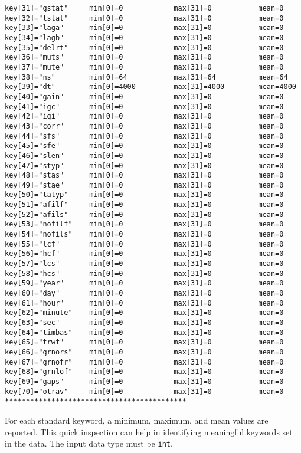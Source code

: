 \begin{verbatim}
key[31]="gstat"     min[0]=0            max[31]=0           mean=0
key[32]="tstat"     min[0]=0            max[31]=0           mean=0
key[33]="laga"      min[0]=0            max[31]=0           mean=0
key[34]="lagb"      min[0]=0            max[31]=0           mean=0
key[35]="delrt"     min[0]=0            max[31]=0           mean=0
key[36]="muts"      min[0]=0            max[31]=0           mean=0
key[37]="mute"      min[0]=0            max[31]=0           mean=0
key[38]="ns"        min[0]=64           max[31]=64          mean=64
key[39]="dt"        min[0]=4000         max[31]=4000        mean=4000
key[40]="gain"      min[0]=0            max[31]=0           mean=0
key[41]="igc"       min[0]=0            max[31]=0           mean=0
key[42]="igi"       min[0]=0            max[31]=0           mean=0
key[43]="corr"      min[0]=0            max[31]=0           mean=0
key[44]="sfs"       min[0]=0            max[31]=0           mean=0
key[45]="sfe"       min[0]=0            max[31]=0           mean=0
key[46]="slen"      min[0]=0            max[31]=0           mean=0
key[47]="styp"      min[0]=0            max[31]=0           mean=0
key[48]="stas"      min[0]=0            max[31]=0           mean=0
key[49]="stae"      min[0]=0            max[31]=0           mean=0
key[50]="tatyp"     min[0]=0            max[31]=0           mean=0
key[51]="afilf"     min[0]=0            max[31]=0           mean=0
key[52]="afils"     min[0]=0            max[31]=0           mean=0
key[53]="nofilf"    min[0]=0            max[31]=0           mean=0
key[54]="nofils"    min[0]=0            max[31]=0           mean=0
key[55]="lcf"       min[0]=0            max[31]=0           mean=0
key[56]="hcf"       min[0]=0            max[31]=0           mean=0
key[57]="lcs"       min[0]=0            max[31]=0           mean=0
key[58]="hcs"       min[0]=0            max[31]=0           mean=0
key[59]="year"      min[0]=0            max[31]=0           mean=0
key[60]="day"       min[0]=0            max[31]=0           mean=0
key[61]="hour"      min[0]=0            max[31]=0           mean=0
key[62]="minute"    min[0]=0            max[31]=0           mean=0
key[63]="sec"       min[0]=0            max[31]=0           mean=0
key[64]="timbas"    min[0]=0            max[31]=0           mean=0
key[65]="trwf"      min[0]=0            max[31]=0           mean=0
key[66]="grnors"    min[0]=0            max[31]=0           mean=0
key[67]="grnofr"    min[0]=0            max[31]=0           mean=0
key[68]="grnlof"    min[0]=0            max[31]=0           mean=0
key[69]="gaps"      min[0]=0            max[31]=0           mean=0
key[70]="otrav"     min[0]=0            max[31]=0           mean=0
*******************************************
\end{verbatim}
For each standard keyword, a minimum, maximum, and mean values are reported.
This quick inspection can help in identifying meaningful keywords set in the
data. The input data type must be \texttt{int}.

